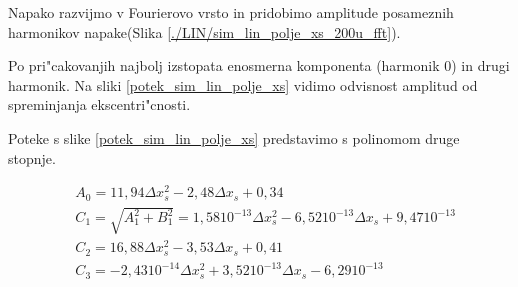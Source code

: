 
Napako razvijmo v Fourierovo vrsto in pridobimo amplitude posameznih harmonikov napake(Slika \ref{./LIN/sim_lin_polje_xs_200u_fft}).

Po pri"cakovanjih najbolj izstopata enosmerna komponenta (harmonik 0) in drugi harmonik. Na sliki \ref{potek_sim_lin_polje_xs} vidimo odvisnost amplitud od spreminjanja ekscentri"cnosti.


Poteke s slike \ref{potek_sim_lin_polje_xs} predstavimo s polinomom druge stopnje.

\begin{eqnarray}
&A_0=11,94 \Delta x_s^2-2,48\Delta x_s+ 0,34\\
&C_1=\sqrt{A_1^2+B_1^2}=1,58 10^{-13} \Delta x_s^2-6,52 10^{-13} \Delta x_s+ 9,47 10^{-13}\\
&C_2=16,88 \Delta x_s^2-3,53  \Delta x_s+0,41\\
&C_3=-2,43 10^{-14} \Delta x_s^2+3,52 10^{-13} \Delta x_s- 6,29 10^{-13}
\end{eqnarray}




